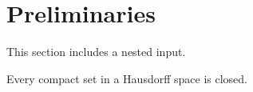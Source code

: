 \section{Preliminaries}

This section includes a nested input.



\begin{theorem}\label{thm:fixture}
Every compact set in a Hausdorff space is closed.
\end{theorem}
